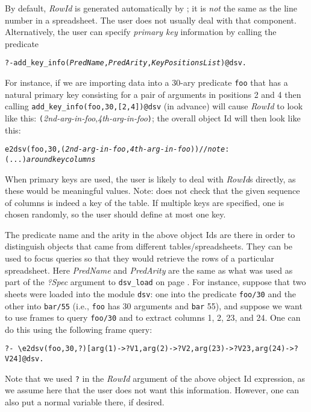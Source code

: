 By default,
\emph{RowId} is generated automatically by \ERGO;
it is \emph{not} the same as the line number
in a spreadsheet. The user does not usually deal with
that component.
Alternatively, the user can specify \emph{primary key} information
by calling the predicate
\begin{alltt}
   ?- add_key_info(\textnormal{\emph{PredName}},\textnormal{\emph{PredArity}},\textnormal{\emph{KeyPositionsList}})@dsv.
\end{alltt}
For instance, if we are importing data into a 30-ary predicate \texttt{foo}
that has a natural primary key consisting for a pair of arguments in positions
2 and 4 then
calling \texttt{add\_key\_info(foo,30,[2,4])@dsv} (in advance)
will cause  \emph{RowId} to look like this:
\texttt{(}\emph{2nd-arg-in-foo},\emph{4th-arg-in-foo}\texttt{)};  the overall object Id
will then look like this:
\begin{alltt}
    \bs{}e2dsv(foo,30,(\textnormal{\emph{2nd-arg-in-foo},\emph{4th-arg-in-foo}})) \hspace{5mm} //\textnormal{\emph{note}: (...) \emph{around key columns}}
\end{alltt}
When primary keys are used, the user is likely to deal with \emph{RowId}s
directly, as these would be meaningful values. 
Note: \ERGO does not check that the given sequence of columns is indeed a
key of the table. If multiple keys are specified, one is chosen randomly, so
the user should define at most one key.

The predicate name and the arity in the above object Ids are there
in order to
distinguish objects that came from different tables/spreadsheets. They can be used
to focus queries so that they would retrieve the rows of a particular
spreadsheet.
Here \emph{PredName} and \emph{PredArity}   are the same as what was used
as part of the \emph{?Spec} argument to \texttt{dsv\_load}   
on page \pageref{pg-dsvload}.
For instance, suppose that two sheets were loaded into
the module \texttt{dsv}: one into the predicate \texttt{foo/30} and
the other into \texttt{bar/55} (i.e., \texttt{foo} has 30 arguments and
\texttt{bar} 55), and suppose we want to use frames to query \texttt{foo/30}
and to extract columns 1, 2, 23, and 24. One can do this using
the following frame query:
\begin{verbatim}
?- \e2dsv(foo,30,?)[arg(1)->?V1,arg(2)->?V2,arg(23)->?V23,arg(24)->?V24]@dsv.
\end{verbatim}
Note that we used \texttt{?} in the \emph{RowId} argument of the above
object Id expression,
as we assume here that the user does not want this information.
However, one can
also put a normal variable there, if desired.

